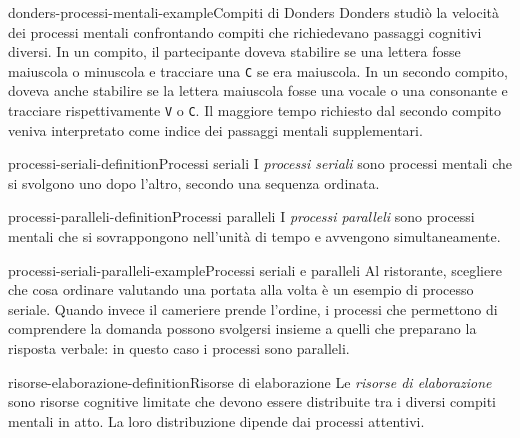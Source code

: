 \documentclass[preview]{standalone}
\begin{document}
\begin{snippetexample}{donders-processi-mentali-example}{Compiti di Donders}
    Donders studiò la velocità dei processi mentali confrontando compiti che
    richiedevano passaggi cognitivi diversi. In un compito, il partecipante
    doveva stabilire se una lettera fosse maiuscola o minuscola e tracciare una
    \texttt{C} se era maiuscola. In un secondo compito, doveva anche stabilire
    se la lettera maiuscola fosse una vocale o una consonante e tracciare
    rispettivamente \texttt{V} o \texttt{C}. Il maggiore tempo richiesto dal
    secondo compito veniva interpretato come indice dei passaggi mentali
    supplementari.
\end{snippetexample}


\begin{snippetdefinition}{processi-seriali-definition}{Processi seriali}
    I \emph{processi seriali} sono processi mentali che si svolgono uno dopo
    l'altro, secondo una sequenza ordinata.
\end{snippetdefinition}

\begin{snippetdefinition}{processi-paralleli-definition}{Processi paralleli}
    I \emph{processi paralleli} sono processi mentali che si sovrappongono
    nell'unità di tempo e avvengono simultaneamente.
\end{snippetdefinition}

\begin{snippetexample}{processi-seriali-paralleli-example}{Processi seriali e paralleli}
    Al ristorante, scegliere che cosa ordinare valutando una portata alla volta
    è un esempio di processo seriale. Quando invece il cameriere prende
    l'ordine, i processi che permettono di comprendere la domanda possono
    svolgersi insieme a quelli che preparano la risposta verbale: in questo caso
    i processi sono paralleli.
\end{snippetexample}


\begin{snippetdefinition}{risorse-elaborazione-definition}{Risorse di elaborazione}
    Le \emph{risorse di elaborazione} sono risorse cognitive limitate che devono
    essere distribuite tra i diversi compiti mentali in atto. La loro
    distribuzione dipende dai processi attentivi.
\end{snippetdefinition}
\end{document}
